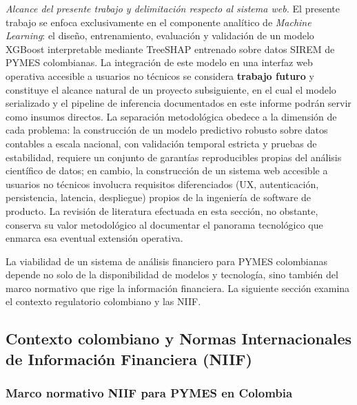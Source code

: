 \documentclass[12pt, letterpaper]{article}
\begin{document}
\textit{Alcance del presente trabajo y delimitaci\'on respecto al sistema web.} El presente trabajo se enfoca exclusivamente en el componente anal\'itico de \textit{Machine Learning}: el dise\~no, entrenamiento, evaluaci\'on y validaci\'on de un modelo XGBoost interpretable mediante TreeSHAP entrenado sobre datos SIREM de PYMES colombianas. La integraci\'on de este modelo en una interfaz web operativa accesible a usuarios no t\'ecnicos se considera \textbf{trabajo futuro} y constituye el alcance natural de un proyecto subsiguiente, en el cual el modelo serializado y el pipeline de inferencia documentados en este informe podr\'an servir como insumos directos. La separaci\'on metodol\'ogica obedece a la dimensi\'on de cada problema: la construcci\'on de un modelo predictivo robusto sobre datos contables a escala nacional, con validaci\'on temporal estricta y pruebas de estabilidad, requiere un conjunto de garant\'ias reproducibles propias del an\'alisis cient\'ifico de datos; en cambio, la construcci\'on de un sistema web accesible a usuarios no t\'ecnicos involucra requisitos diferenciados (UX, autenticaci\'on, persistencia, latencia, despliegue) propios de la ingenier\'ia de software de producto. La revisi\'on de literatura efectuada en esta secci\'on, no obstante, conserva su valor metodol\'ogico al documentar el panorama tecnol\'ogico que enmarca esa eventual extensi\'on operativa.

La viabilidad de un sistema de an\'alisis financiero para PYMES colombianas depende no solo de la disponibilidad de modelos y tecnolog\'ia, sino tambi\'en del marco normativo que rige la informaci\'on financiera. La siguiente secci\'on examina el contexto regulatorio colombiano y las NIIF.

\subsection{Contexto colombiano y Normas Internacionales de Informaci\'on Financiera (NIIF)}
\label{sec:niif}

\subsubsection{Marco normativo NIIF para PYMES en Colombia}
\end{document}
